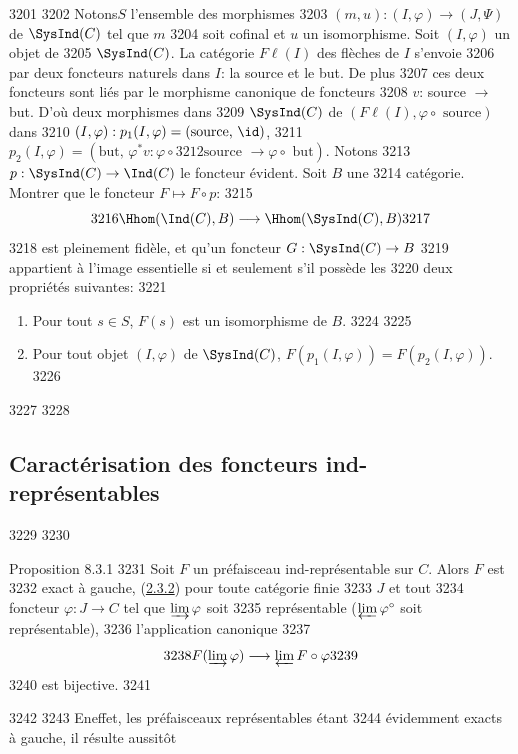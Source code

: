   3201	
  3202	Notons\pageoriginale $S$ l'ensemble des morphismes
  3203	$(m,u):(I,\varphi)\rightarrow (J,\Psi)$ de $\SysInd(C)$ tel que $m$
  3204	soit cofinal et $u$ un isomorphisme. Soit $(I,\varphi)$ un objet de
  3205	$\SysInd(C)$. La catégorie $F\ell(I)$ des flèches de $I$ s'envoie
  3206	par deux foncteurs naturels dans $I$: la source et le but. De plus
  3207	ces deux foncteurs sont liés par le morphisme canonique de foncteurs
  3208	$v$: source $\rightarrow$ but. D'où deux morphismes dans
  3209	$\SysInd(C)$ de $(F\ell(I),\varphi\circ\text{ source})$ dans
  3210	$(I,\varphi):p_1(I,\varphi)=(\text{source, } \id)$,
  3211	$p_2(I,\varphi)=(\mbox{but, } \varphi^\ast v:\varphi\circ
  3212	\text{source }\rightarrow \varphi\circ{\text{ but}})$. Notons
  3213	$p:\SysInd(C)\rightarrow\Ind(C)$ le foncteur évident. Soit $B$ une
  3214	catégorie. Montrer que le foncteur $F\mapsto F\circ p$:
  3215	$$
  3216	\Hhom(\Ind(C),B)\longrightarrow \Hhom(\SysInd(C),B)
  3217	$$
  3218	est pleinement fidèle, et qu'un foncteur $G:\SysInd(C)\rightarrow B$
  3219	appartient à l'image essentielle si et seulement s'il possède les
  3220	deux propriétés suivantes:
  3221	\begin{enumerate}
  3222	\renewcommand{\labelenumi}{\theenumi)}
  3223	\item Pour tout $s\in S$, $F(s)$ est un isomorphisme de $B$.
  3224	
  3225	\item Pour tout objet $(I,\varphi)$ de $\SysInd(C)$, $F(p_1(I,\varphi))=F(p_2(I,\varphi))$.
  3226	\end{enumerate}
  3227	
  3228	\subsection{Caractérisation des foncteurs ind-représentables}
  3229	
  3230	\begin{enonce*}{Proposition 8.3.1}
  3231	Soit $F$ un préfaisceau ind-représentable sur $C$. Alors $F$ est
  3232	exact à gauche, \ie (\hyperref[I.cor2.3.2]{2.3.2}) pour toute catégorie finie
  3233	$J$ et tout
  3234	foncteur $\varphi:J\rightarrow C$ tel que $\varinjlim \varphi$ soit
  3235	représentable (\ie $\varprojlim \varphi^\circ$ soit représentable),
  3236	l'application canonique
  3237	$$
  3238	F(\varinjlim \varphi)\longrightarrow \varprojlim F\circ\varphi
  3239	$$
  3240	est bijective.
  3241	\end{enonce*}
  3242	
  3243	En\pageoriginale effet, les préfaisceaux représentables étant
  3244	évidemment exacts à gauche, il résulte aussitôt
